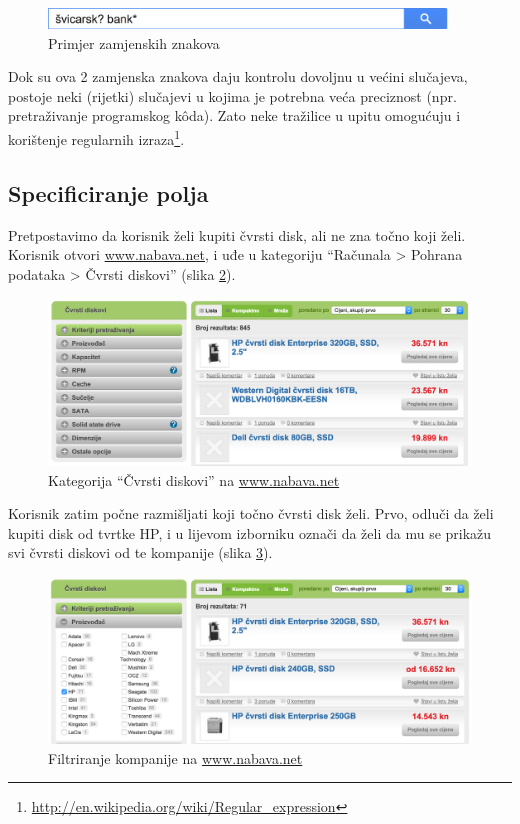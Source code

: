 \documentclass[a4paper,twoside,12pt]{scrreprt}
\begin{document}
\begin{figure}[H]
  \centering
  \includegraphics[width=300pt]{wildcards}
  \caption{Primjer zamjenskih znakova}
  \label{wildcards}
\end{figure}

Dok su ova 2 zamjenska znakova daju kontrolu dovoljnu u većini slučajeva, postoje neki (rijetki) slučajevi u kojima je potrebna veća preciznost (npr. pretraživanje programskog kôda). Zato neke tražilice u upitu omogućuju i korištenje regularnih izraza\footnote{\url{http://en.wikipedia.org/wiki/Regular_expression}}.

\subsection{Specificiranje polja}

Pretpostavimo da korisnik želi kupiti čvrsti disk, ali ne zna točno koji želi. Korisnik otvori \url{www.nabava.net}, i uđe u kategoriju ``Računala > Pohrana podataka > Čvrsti diskovi'' (slika \ref{nabava1}).

\begin{figure}[H]
  \centering
  \includegraphics[width=\textwidth]{nabava1}
  \caption{Kategorija ``Čvrsti diskovi'' na \url{www.nabava.net}}
  \label{nabava1}
\end{figure}

Korisnik zatim počne razmišljati koji točno čvrsti disk želi. Prvo, odluči da želi kupiti disk od tvrtke HP, i u lijevom izborniku označi da želi da mu se prikažu svi čvrsti diskovi od te kompanije (slika \ref{nabava2}).

\begin{figure}[H]
  \centering
  \includegraphics[width=\textwidth]{nabava2}
  \caption{Filtriranje kompanije na \url{www.nabava.net}}
  \label{nabava2}
\end{figure}
\end{document}
